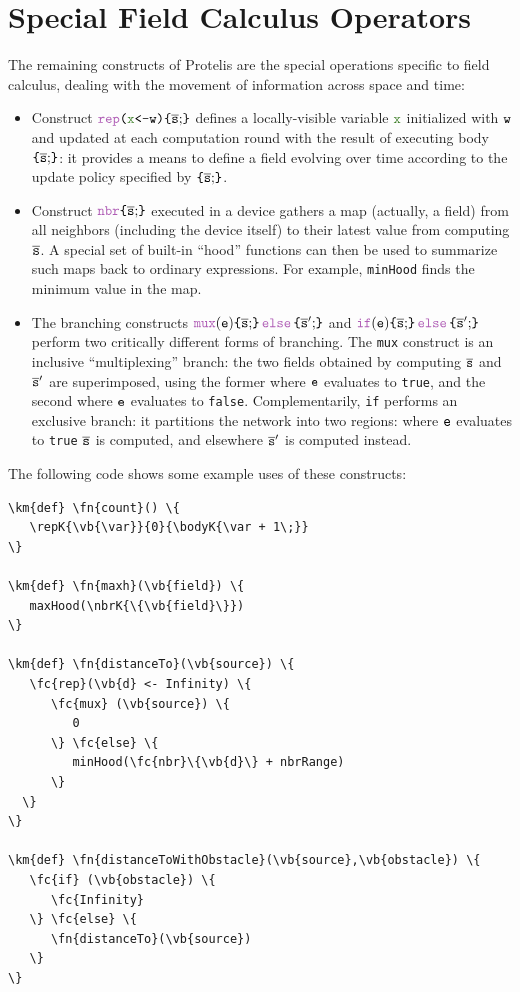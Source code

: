 \documentclass[12pt,a4paper,twoside,openright]{book}
\begin{document}
\section{Special Field Calculus Operators}
\label{protelis-special-operators}
The remaining constructs of Protelis are the special operations specific to field calculus, dealing with the movement of information across space and time:
\begin{itemize}
	\item Construct $\repK{\vb{\var}}{\we}{\bodyK{\overline{\s};}}$ defines a locally-visible variable $\vb{\var}$ initialized with $\texttt{w}$ and updated at each computation round with the result of executing body $\bodyK{\overline{\s};}$: it provides a means to define a field evolving over time according to the update policy specified by $\bodyK{\overline{\s};}$.
%
	\item Construct $\nbrK{\bodyK{\overline{\s};}}$ executed in a device gathers a map (actually, a field) from all neighbors (including the device itself) to their latest value from computing $\overline{\texttt{s}}$. A special set of built-in ``hood'' functions can then be used to summarize such maps back to ordinary expressions.
	For example, {\tt minHood} finds the minimum value in the map.
%
  \item The branching constructs $\muxK{\e}{\bodyK{\overline{\s};}}{\bodyK{\overline{\s}';}}$ and $\ifK{\e}{\bodyK{\overline{\s};}}{\bodyK{\overline{\s}';}}$ perform two critically different forms of branching.
%
	The {\tt mux} construct is an inclusive ``multiplexing'' branch: the two fields obtained by computing $\overline{\texttt{s}}$ and $\overline{\texttt{s}}'$ are superimposed, using the former where $\texttt{e}$ evaluates to \texttt{true}, and the second where $\texttt{e}$ evaluates to \texttt{false}.
%
	Complementarily, {\tt if} performs an exclusive branch: it partitions the network into two regions: where $\texttt{e}$ evaluates to \texttt{true} $\overline{\texttt{s}}$ is computed, and elsewhere $\overline{\texttt{s}}'$ is computed instead.
\end{itemize}

The following code shows some example uses of these constructs:

\begin{Verbatim}[samepage=true,frame=single, commandchars=\\\{\}]
\km{def} \fn{count}() \{
   \repK{\vb{\var}}{0}{\bodyK{\var + 1\;}}
\}

\km{def} \fn{maxh}(\vb{field}) \{
   maxHood(\nbrK{\{\vb{field}\}})
\}

\km{def} \fn{distanceTo}(\vb{source}) \{
   \fc{rep}(\vb{d} <- Infinity) \{
      \fc{mux} (\vb{source}) \{
         0
      \} \fc{else} \{
         minHood(\fc{nbr}\{\vb{d}\} + nbrRange)
      \}
  \}
\}

\km{def} \fn{distanceToWithObstacle}(\vb{source},\vb{obstacle}) \{
   \fc{if} (\vb{obstacle}) \{
      \fc{Infinity}
   \} \fc{else} \{
      \fn{distanceTo}(\vb{source})
   \}
\}
\end{Verbatim}
\end{document}
